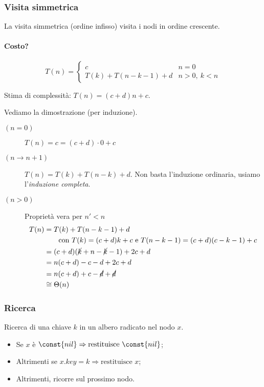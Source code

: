 \subsubsection{Visita simmetrica} La visita simmetrica (ordine infisso) visita i nodi in ordine
crescente.



\paragraph{Costo?} 
\[ T(n) =
\begin{cases}
	c & n = 0 \\
	T(k) + T(n - k - 1) + d & n > 0, \ k < n
\end{cases}
\]

Stima di complessità: $T(n) = (c+d)n + c$. \par
Vediamo la dimostrazione (per induzione).

\begin{description}
	\item[$(n = 0)$] $T(n) = c = (c + d) \cdot 0 + c$
	\item[$(n \rightarrow n+1)$] $T(n) = T(k) + T(n-k) + d$. Non basta l'induzione ordinaria, usiamo 
	l'\emph{induzione completa}.
	\item[$(n > 0)$] Proprietà vera per $n' < n$
	\begin{align*}
		T(n) & = T(k) + T(n - k - 1) + d \\
		& \qquad \text{con } T(k) = (c+d)k + c \text{ e } T(n-k-1) = (c+d)(c-k-1)+c \\
		& = (c+d)(\cancel{k} + n - \cancel{k} - 1) + 2c + d \\
		& = n(c+d) - c - d + 2c + d \\
		& = n(c+d) + c - \cancel{d} + \cancel{d} \\
		& \cong \Theta(n)
	\end{align*}
\end{description}

\subsubsection{Ricerca} 
Ricerca di una chiave $k$ in un albero radicato nel nodo $x$.

\begin{itemize}
	\item Se $x$ è $\const{nil} \Rightarrow \text{restituisce } \const{nil}$;
	\item Altrimenti se $x.key = k \Rightarrow \text{restituisce } x$;
	\item Altrimenti, ricorre sul prossimo nodo.
\end{itemize}

